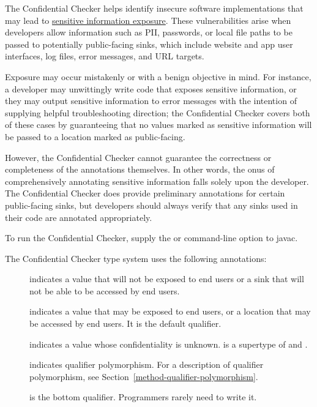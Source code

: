 \htmlhr
{}

The Confidential Checker helps identify insecure software implementations that may
lead to \href{https://cwe.mitre.org/data/definitions/1417.html}{sensitive information
exposure}. These vulnerabilities arise when developers allow information such as PII,
passwords, or local file paths to be passed to potentially public-facing sinks, which
include website and app user interfaces, log files, error messages, and URL targets.

Exposure may occur mistakenly or with a benign objective in mind. For instance, a developer
may unwittingly write code that exposes sensitive information, or they may output
sensitive information to error messages with the intention of supplying helpful
troubleshooting direction; the Confidential Checker covers both of these cases by
guaranteeing that no values marked as sensitive information will be passed to a
location marked as public-facing.

However, the Confidential Checker cannot guarantee the correctness or completeness
of the annotations themselves. In other words, the onus of comprehensively annotating
sensitive information falls solely upon the developer. The Confidential Checker does
provide preliminary annotations for certain public-facing sinks, but developers should
always verify that any sinks used in their code are annotated appropriately.

To run the Confidential Checker, supply the
or
command-line option to javac.



The Confidential Checker type system uses the following annotations:

\begin{description}
\item[]
    indicates a value that will not be exposed to end users or a sink that
    will not be able to be accessed by end users.
\item[]
    indicates a value that may be exposed to end users, or a location that
    may be accessed by end users. It is the default qualifier.
\item[]
    indicates a value whose confidentiality is unknown.
     is a supertype of 
    and .
\item[]
    indicates qualifier polymorphism. For a description of qualifier polymorphism,
    see Section~\ref{method-qualifier-polymorphism}.
\item[]
    is the bottom qualifier. Programmers rarely need to write it.
\end{description}

